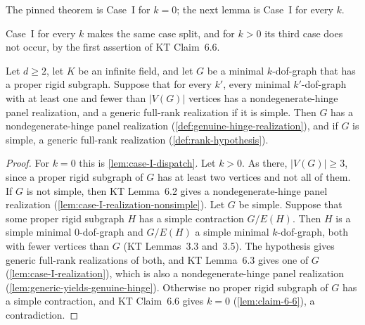 \begin{fmlnote}
  The pinned theorem is Case~I for $k = 0$; the next lemma is Case~I for
  every $k$.
\end{fmlnote}

Case~I for every $k$ makes the same case split, and for $k > 0$ its
third case does not occur, by the first assertion of KT Claim~6.6.

\begin{lemma}[Case~I; KT \S6.2]
  \label{lem:case-I-all-k}
  \leanok
  Let $d \ge 2$, let $K$ be an infinite field, and let $G$ be a minimal
  $k$-dof-graph that has a proper rigid subgraph. Suppose that for every
  $k'$, every minimal $k'$-dof-graph with at least one and fewer than
  $|V(G)|$ vertices has a nondegenerate-hinge panel realization, and a
  generic full-rank realization if it is simple. Then $G$ has a
  nondegenerate-hinge panel realization
  (\cref{def:genuine-hinge-realization}), and if $G$ is simple, a
  generic full-rank realization (\cref{def:rank-hypothesis}).
\end{lemma}
\begin{proof}
  \leanok
  For $k = 0$ this is \cref{lem:case-I-dispatch}. Let $k > 0$. As there,
  $|V(G)| \ge 3$, since a proper rigid subgraph of $G$ has at least two
  vertices and not all of them. If $G$ is not simple, then KT Lemma~6.2
  gives a nondegenerate-hinge panel realization
  (\cref{lem:case-I-realization-nonsimple}). Let $G$ be
  simple. Suppose that some proper rigid subgraph $H$ has a simple
  contraction $G/E(H)$. Then $H$ is a simple minimal $0$-dof-graph and
  $G/E(H)$ a simple minimal $k$-dof-graph, both with fewer vertices than
  $G$ (KT Lemmas~3.3 and~3.5). The hypothesis gives generic full-rank
  realizations of both, and KT Lemma~6.3 gives one of $G$
  (\cref{lem:case-I-realization}), which is also a nondegenerate-hinge
  panel realization (\cref{lem:generic-yields-genuine-hinge}). Otherwise
  no proper rigid subgraph of $G$ has a simple contraction, and KT
  Claim~6.6 gives $k = 0$ (\cref{lem:claim-6-6}), a contradiction.
\end{proof}
